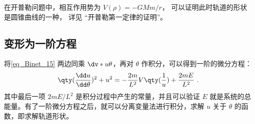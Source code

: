 在开普勒问题中，相互作用势为 $V(\rho)=-GMm/r$， 可以证明此时轨道的形状是圆锥曲线的一种， 详见 “开普勒第一定律的证明”。

\subsection{变形为一阶方程}
将\autoref{eq_Binet_15} 两边同乘 $\dv*{u}{\theta}$，再对 $\theta$ 作积分，可以得到一阶的微分方程：
\begin{equation}\label{eq_Binet_3}
\qty(\frac{\dd u}{\dd \theta})^2+u^2=-\frac{2m}{L^2}V\qty(\frac{1}{u})+\frac{2 m E}{L^2}~.
\end{equation}
其中最后一项 $2mE/L^2$ 是积分过程中产生的常量，并且可以验证 $E$ 就是系统的总能量。有了一阶微分方程之后，就可以分离变量法进行积分，求解 $u$ 关于 $\theta$ 的函数，即求解轨道形状。
